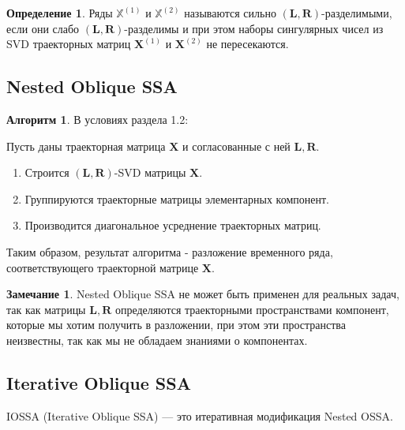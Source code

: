 \documentclass[specialist,
               substylefile = spbu_report.rtx,
               subf,href,colorlinks=true, 12pt]{disser}
\theoremstyle{definition}
\newtheorem{definition}{Определение}
\newtheorem{algorithm}{Алгоритм}
\newtheorem{remark}{Замечание}
\begin{document}
\begin{definition}
    Ряды $\mathbb{X}^{(1)}$ и $\mathbb{X}^{(2)}$ называются сильно $(\mathbf{L}, \mathbf{R})$-разделимыми, если они слабо $(\mathbf{L}, \mathbf{R})$-разделимы и при этом наборы сингулярных чисел из SVD траекторных матриц $\mathbf{X}^{(1)}$ и $\mathbf{X}^{(2)}$ не пересекаются.
\end{definition}


\subsection{Nested Oblique SSA}
\begin{algorithm}
    В условиях раздела 1.2:
\end{algorithm}
Пусть даны траекторная матрица $\mathbf{X}$ и согласованные с ней $\mathbf{L}, \mathbf{R}$.
    \begin{enumerate}
        \item Строится $(\mathbf{L}, \mathbf{R})$-SVD матрицы $\mathbf{X}$.
        \item Группируются траекторные матрицы элементарных компонент.
        \item Производится диагональное усреднение траекторных матриц.
    \end{enumerate}
    Таким образом, результат алгоритма - разложение временного ряда, соответствующего траекторной матрице $\mathbf{X}$.
    \begin{remark}
    Nested Oblique SSA не может быть применен для реальных задач, так как матрицы $\mathbf{L}, \mathbf{R}$ определяются траекторными пространствами компонент, которые мы хотим получить в разложении, при этом эти пространства неизвестны, так как мы не обладаем знаниями о компонентах.
    \end{remark}
\subsection{Iterative Oblique SSA}
    IOSSA (Iterative Oblique SSA) --- это итеративная модификация Nested OSSA. 
    
\end{document}
